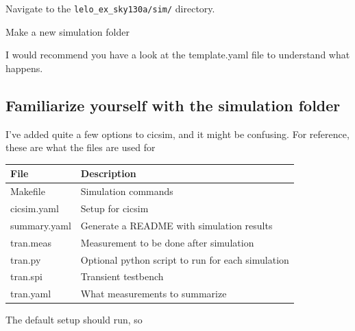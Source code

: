 Navigate to the \texttt{lelo\_ex\_sky130a/sim/} directory.

Make a new simulation folder

\begin{Shaded}
\begin{Highlighting}[]
\DataTypeTok{\textbackslash{}}
\end{Highlighting}
\end{Shaded}

I would recommend you have a look at the template.yaml file to
understand what happens.

\subsection{Familiarize yourself with the simulation
folder}\label{familiarize-yourself-with-the-simulation-folder}

I've added quite a few options to cicsim, and it might be confusing. For
reference, these are what the files are used for

\begin{longtable}[]{@{}
  >{\raggedright\arraybackslash}p{}
  >{\raggedright\arraybackslash}p{}@{}}
\toprule\noalign{}
\begin{minipage}[b]{\linewidth}\raggedright
File
\end{minipage} & \begin{minipage}[b]{\linewidth}\raggedright
Description
\end{minipage} \\
\midrule\noalign{}
\endhead
\bottomrule\noalign{}
\endlastfoot
Makefile & Simulation commands \\
cicsim.yaml & Setup for cicsim \\
summary.yaml & Generate a README with simulation results \\
tran.meas & Measurement to be done after simulation \\
tran.py & Optional python script to run for each simulation \\
tran.spi & Transient testbench \\
tran.yaml & What measurements to summarize \\
\end{longtable}

The default setup should run, so

